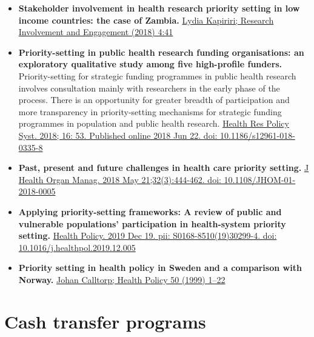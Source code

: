 \documentclass[]{book}
\begin{document}
\begin{itemize}
\item
  \textbf{Stakeholder involvement in health research priority setting in low income countries: the case of Zambia.} \href{https://www.ncbi.nlm.nih.gov/pmc/articles/PMC6234591/pdf/40900_2018_Article_121.pdf}{Lydia Kapiriri; Research Involvement and Engagement (2018) 4:41}
\item
  \textbf{Priority-setting in public health research funding organisations: an exploratory qualitative study among five high-profile funders.} Priority-setting for strategic funding programmes in public health research involves consultation mainly with researchers in the early phase of the process. There is an opportunity for greater breadth of participation and more transparency in priority-setting mechanisms for strategic funding programmes in population and public health research. \href{https://www.ncbi.nlm.nih.gov/pmc/articles/PMC6014000/}{Health Res Policy Syst. 2018; 16: 53. Published online 2018 Jun 22. doi: 10.1186/s12961-018-0335-8}
\item
  \textbf{Past, present and future challenges in health care priority setting.} \href{https://www.ncbi.nlm.nih.gov/pubmed/29771204}{J Health Organ Manag. 2018 May 21;32(3):444-462. doi: 10.1108/JHOM-01-2018-0005}
\item
  \textbf{Applying priority-setting frameworks: A review of public and vulnerable populations' participation in health-system priority setting.} \href{https://www.ncbi.nlm.nih.gov/pubmed/31874742}{Health Policy. 2019 Dec 19. pii: S0168-8510(19)30299-4. doi: 10.1016/j.healthpol.2019.12.005}
\item
  \textbf{Priority setting in health policy in Sweden and a comparison with Norway.} \href{http://www.medicine.mcgill.ca/epidemiology/courses/EPIB654/Summer2010/Policy/Health\%20policy\%20-\%20Sweden\%20-\%20compare\%20w-Norway.pdf}{Johan Calltorp; Health Policy 50 (1999) 1--22}
\end{itemize}

\hypertarget{cash-transfer-programs}{%
\section*{Cash transfer programs}\label{cash-transfer-programs}}
\end{document}
